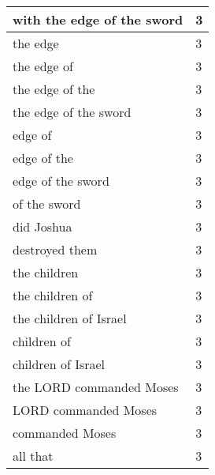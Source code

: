 \begin{center}
\begin{longtable}{|p{3.0in}|p{0.5in}|}
with the edge of the sword & 3\\ \hline 
the edge & 3\\ \hline 
the edge of & 3\\ \hline 
the edge of the & 3\\ \hline 
the edge of the sword & 3\\ \hline 
edge of & 3\\ \hline 
edge of the & 3\\ \hline 
edge of the sword & 3\\ \hline 
of the sword & 3\\ \hline 
did Joshua & 3\\ \hline 
destroyed them & 3\\ \hline 
the children & 3\\ \hline 
the children of & 3\\ \hline 
the children of Israel & 3\\ \hline 
children of & 3\\ \hline 
children of Israel & 3\\ \hline 
the LORD commanded Moses & 3\\ \hline 
LORD commanded Moses & 3\\ \hline 
commanded Moses & 3\\ \hline 
all that & 3\\ \hline 
\end{longtable}
\end{center}





